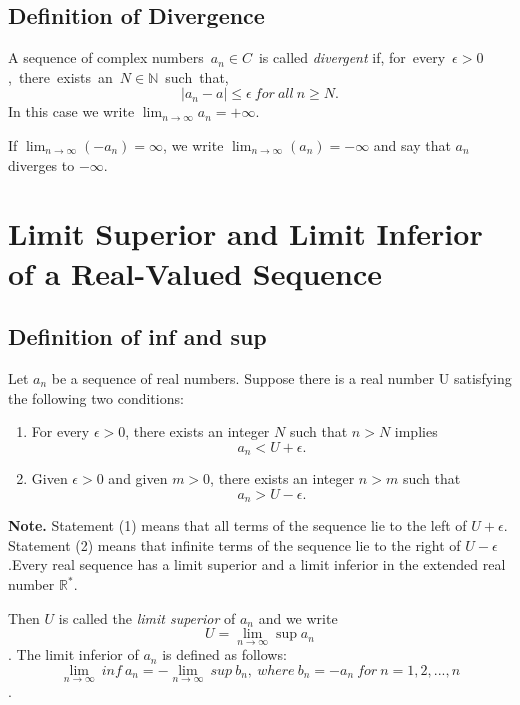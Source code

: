 \documentclass{article}
\begin{document}
\subsection{Definition of Divergence}
A sequence of complex numbers\ $a_{n}\in C$\ is called \textit{divergent} if,
for\ every\ $\epsilon>0$,\ there\ exists\ an\ $N\in\mathbb{N}$\ such\ that,
$$|a_{n}-a|\leq\epsilon\ for\ all\ n\geq N.$$
In this case we write $\lim_{n\rightarrow\infty}a_{n}=+\infty$.

If $\lim_{n\rightarrow\infty}(-a_{n})=\infty$, we write $\lim_{n\rightarrow\infty}(a_{n})=-\infty$ and say that $a_{n}$ 
diverges to $-\infty$. 

\section{Limit Superior and Limit Inferior of a Real-Valued Sequence}
\subsection{Definition of inf and sup}
Let ${a_{n}}$ be a sequence of real numbers. Suppose there is a real number U 
satisfying the following two conditions:

\begin{enumerate}
    \item For every $\epsilon > 0$, there exists an integer $N$ such that $n>N$ 
    implies $$a_{n}<U+\epsilon.$$
    \item Given $\epsilon>0$ and given $m>0$, there exists an integer $n>m$ such that 
    $$a_{n}>U-\epsilon.$$ 
\end{enumerate}

\textbf{Note.} Statement (1) means that all terms of the sequence lie to the left 
of $U+\epsilon$. Statement (2) means that infinite terms of the sequence lie to the 
right of $U-\epsilon$.Every real sequence has a limit superior and a limit inferior 
in the extended real number $\mathbb{R^{*}}$.

Then $U$ is called the \textit{limit superior} of ${a_{n}}$
and we write $$U=\lim_{n\rightarrow \infty}\sup{a_{n}}$$.
The limit inferior of ${a_{n}}$ is defined as follows:
$$\lim_{n\rightarrow \infty}\ inf\ a_{n}=-\lim_{n\rightarrow \infty}\ sup\ b_{n},\ where\ b_{n}=-a_{n}\ for\ n=1,2,...,n$$.
\end{document}

